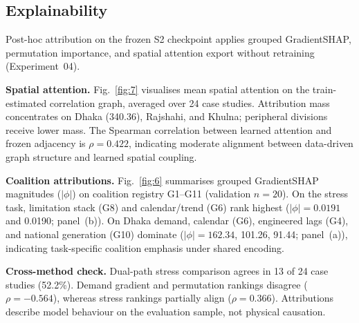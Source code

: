 \subsection{Explainability}

Post-hoc attribution \cite{Lundberg2017SHAP,Sundararajan2017IntegratedGradients} on the frozen S2 checkpoint applies grouped GradientSHAP, permutation importance, and spatial attention export without retraining (Experiment~04).

\noindent\textbf{Spatial attention.}
Fig.~\ref{fig:7} visualises mean spatial attention on the train-estimated correlation graph, averaged over 24 case studies. Attribution mass concentrates on Dhaka (340.36), Rajshahi, and Khulna; peripheral divisions receive lower mass. The Spearman correlation between learned attention and frozen adjacency is $\rho{=}0.422$, indicating moderate alignment between data-driven graph structure and learned spatial coupling.



\noindent\textbf{Coalition attributions.}
Fig.~\ref{fig:6} summarises grouped GradientSHAP magnitudes ($|\phi|$) on coalition registry G1--G11 (validation $n{=}20$). On the stress task, limitation stack (G8) and calendar/trend (G6) rank highest ($|\phi|{=}0.0191$ and 0.0190; panel~(b)). On Dhaka demand, calendar (G6), engineered lags (G4), and national generation (G10) dominate ($|\phi|{=}162.34$, 101.26, 91.44; panel~(a)), indicating task-specific coalition emphasis under shared encoding.



\noindent\textbf{Cross-method check.}
Dual-path stress comparison agrees in 13 of 24 case studies (52.2\%). Demand gradient and permutation rankings disagree ($\rho{=}{-}0.564$), whereas stress rankings partially align ($\rho{=}0.366$). Attributions describe model behaviour on the evaluation sample, not physical causation.
